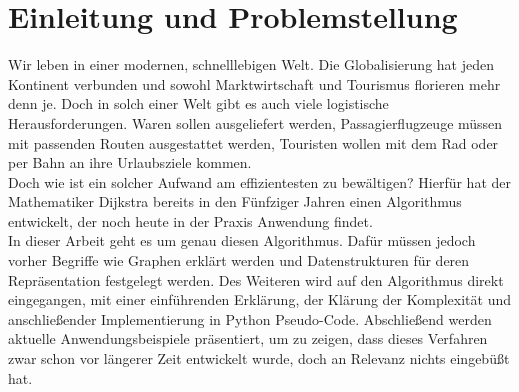 \chapter{Einleitung und Problemstellung}

Wir leben in einer modernen, schnelllebigen Welt. Die Globalisierung hat jeden Kontinent verbunden und sowohl Marktwirtschaft und Tourismus florieren mehr denn je. 
Doch in solch einer Welt gibt es auch viele logistische Herausforderungen. Waren sollen ausgeliefert werden, Passagierflugzeuge müssen mit passenden Routen ausgestattet werden, Touristen wollen mit dem Rad oder per Bahn an ihre Urlaubsziele kommen. \\
Doch wie ist ein solcher Aufwand am effizientesten zu bewältigen? 
Hierfür hat der Mathematiker Dijkstra bereits in den Fünfziger Jahren einen Algorithmus entwickelt, der noch heute in der Praxis Anwendung findet. \\
In dieser Arbeit geht es um genau diesen Algorithmus. 
Dafür müssen jedoch vorher Begriffe wie \glqq Graphen \grqq erklärt werden und Datenstrukturen für deren Repräsentation festgelegt werden.
Des Weiteren wird auf den Algorithmus direkt eingegangen, mit einer einführenden Erklärung, der Klärung der Komplexität und anschließender Implementierung in Python Pseudo-Code.
Abschließend werden aktuelle Anwendungsbeispiele präsentiert, um zu zeigen, dass dieses Verfahren zwar schon vor längerer Zeit entwickelt wurde, doch an Relevanz nichts eingebüßt hat.
\\
\\
